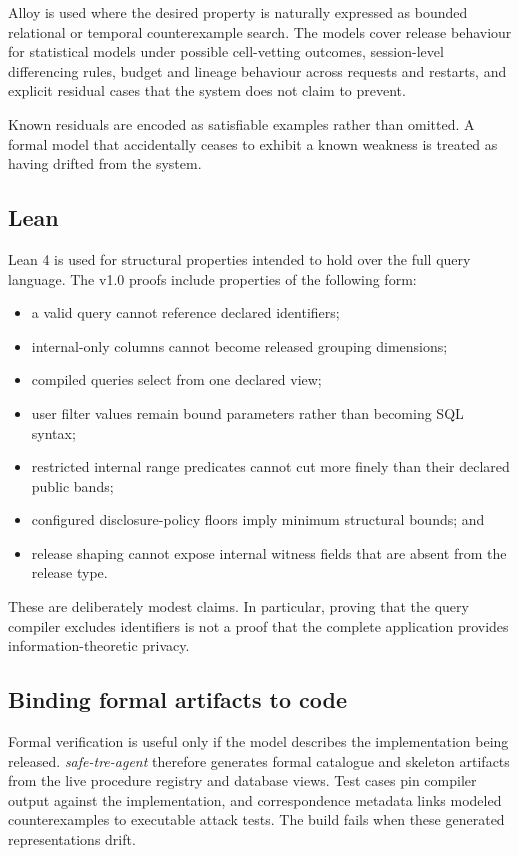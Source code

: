 \documentclass[11pt,a4paper]{article}
\begin{document}
Alloy is used where the desired property is naturally expressed as bounded
relational or temporal counterexample search. The models cover release
behaviour for statistical models under possible cell-vetting outcomes,
session-level differencing rules, budget and lineage behaviour across requests
and restarts, and explicit residual cases that the system does not claim to
prevent.

Known residuals are encoded as satisfiable examples rather than omitted. A
formal model that accidentally ceases to exhibit a known weakness is treated as
having drifted from the system.

\subsection{Lean}
\label{sec:lean}

Lean 4 is used for structural properties intended to hold over the full query
language. The v1.0 proofs include properties of the following form:

\begin{itemize}[leftmargin=*]
  \item a valid query cannot reference declared identifiers;
  \item internal-only columns cannot become released grouping dimensions;
  \item compiled queries select from one declared view;
  \item user filter values remain bound parameters rather than becoming SQL
  syntax;
  \item restricted internal range predicates cannot cut more finely than their
  declared public bands;
  \item configured disclosure-policy floors imply minimum structural bounds;
  and
  \item release shaping cannot expose internal witness fields that are absent
  from the release type.
\end{itemize}

These are deliberately modest claims. In particular, proving that the query
compiler excludes identifiers is not a proof that the complete application
provides information-theoretic privacy.

\subsection{Binding formal artifacts to code}

Formal verification is useful only if the model describes the implementation
being released. \textit{safe-tre-agent} therefore generates formal catalogue
and skeleton artifacts from the live procedure registry and database views.
Test cases pin compiler output against the implementation, and correspondence
metadata links modeled counterexamples to executable attack tests. The build
fails when these generated representations drift.
\end{document}
